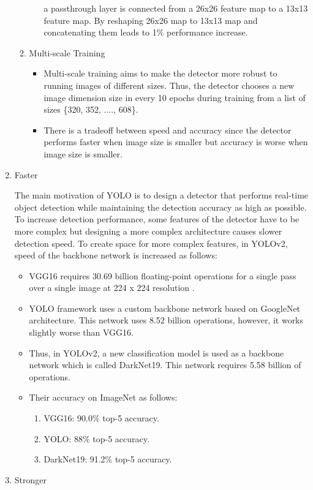 \documentclass{article}
\begin{document}
\begin{enumerate}
\begin{enumerate}
\begin{itemize}
        a passthrough layer is connected from a 26x26 feature map to a 13x13 feature map. 
        By reshaping 26x26 map to 13x13 map and concatenating them leads to 1\% performance increase. 
        \end{itemize}
        \item Multi-scale Training
        \begin{itemize}
            \item Multi-scale training aims to make the detector more robust 
            to running images of different sizes. Thus, the detector chooses a new 
            image dimension size in every 10 epochs during training from a list of 
            sizes \{320, 352, ...., 608\}.
            \item There is a tradeoff between speed and accuracy since the detector 
            performs faster when image size is smaller but accuracy is worse when 
            image size is smaller.
        \end{itemize}
    \end{enumerate}
    \item Faster

    The main motivation of YOLO is to design a detector that performs 
    real-time object detection while maintaining the detection accuracy as high 
    as possible. To increase detection performance, some features of the detector 
    have to be more complex but designing a more complex architecture causes 
    slower detection speed. To create space for more complex features, in 
    YOLOv2, speed of the backbone network is increased as follows:
    \begin{itemize}
        \item VGG16 requires 30.69 billion floating-point operations for a single 
        pass over a single image at 224 x 224 resolution \cite{yolo9000cite}.
        \item YOLO framework uses a custom backbone network based on GoogleNet 
        architecture. This network uses 8.52 billion operations, however, it works 
        slightly worse than VGG16.
        \item Thus, in YOLOv2, a new classification model is used as a backbone network 
        which is called DarkNet19. This network requires 5.58 billion of operations.
        \item Their accuracy on ImageNet as follows:
        \begin{enumerate}
            \item VGG16: 90.0\% top-5 accuracy.
            \item YOLO: 88\% top-5 accuracy.
            \item DarkNet19: 91.2\% top-5 accuracy.
        \end{enumerate}
    \end{itemize}
    \item Stronger
    

\end{enumerate}
\end{document}
